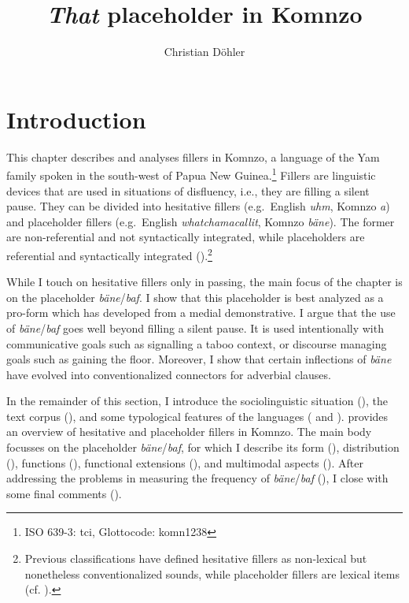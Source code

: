 \documentclass[output=paper,colorlinks,citecolor=brown]{langscibook}
\author{Christian Döhler\orcid{0000-0002-9659-5920}\affiliation{Berlin-Brandenburg Academy of Sciences and Humanities}}
\title{\textit{That} placeholder in \uppercase{K}omnzo}
\begin{document}
\maketitle
\graphicspath{{figures/doehler}}
\section{Introduction}\label{sec:doehler:intro}

This chapter describes and analyses fillers in Komnzo, a language of the Yam family spoken in the south-west of Papua New Guinea.\footnote{ISO 639-3: tci, Glottocode: komn1238} Fillers are linguistic devices that are used in situations of disfluency, i.e., they are filling a silent pause. They can be divided into hesitative fillers (e.g.\ English \textit{uhm}, Komnzo \emph{a}) and placeholder fillers (e.g.\ English \textit{whatchamacallit}, Komnzo \emph{bäne}). The former are non-referential and not syntactically integrated, while placeholders are referential and syntactically integrated (\cite{Hayashi:2010xh}).\footnote{Previous classifications have defined hesitative fillers as non-lexical but nonetheless conventionalized sounds, while placeholder fillers are lexical items (cf. \cite{Amiridze:2010aa}).} 

While I touch on hesitative fillers only in passing, the main focus of the chapter is on the placeholder \textit{bäne}/\textit{baf}. I show that this placeholder is best analyzed as a pro-form which has developed from a medial demonstrative. I argue that the use of \textit{bäne}/\textit{baf} goes well beyond filling a silent pause. It is used intentionally with communicative goals such as signalling a taboo context, or discourse managing goals such as gaining the floor. Moreover, I show that certain inflections of \textit{bäne} have evolved into conventionalized connectors for adverbial clauses.

In the remainder of this section, I introduce the sociolinguistic situation (), the text corpus  (), and some typological features of the languages ( and ).  provides an overview of hesitative and placeholder fillers in Komnzo. The main body focusses on the placeholder \textit{bäne}/\emph{baf}, for which I describe its form (), distribution (), functions (), functional extensions (), and multimodal aspects (). After addressing the problems in measuring the frequency of \textit{bäne}/\textit{baf} (), I close with some final comments ().
\end{document}
